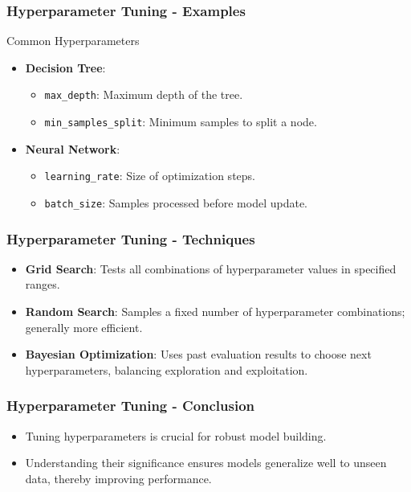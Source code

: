 \documentclass[aspectratio=169]{beamer}
\begin{document}
\begin{frame}[fragile]
    \frametitle{Hyperparameter Tuning - Examples}
    \begin{block}{Common Hyperparameters}
        \begin{itemize}
            \item \textbf{Decision Tree}:
            \begin{itemize}
                \item \texttt{max\_depth}: Maximum depth of the tree.
                \item \texttt{min\_samples\_split}: Minimum samples to split a node.
            \end{itemize}
            \item \textbf{Neural Network}:
            \begin{itemize}
                \item \texttt{learning\_rate}: Size of optimization steps.
                \item \texttt{batch\_size}: Samples processed before model update.
            \end{itemize}
        \end{itemize}
    \end{block}
\end{frame}

\begin{frame}[fragile]
    \frametitle{Hyperparameter Tuning - Techniques}
    \begin{itemize}
        \item \textbf{Grid Search}: Tests all combinations of hyperparameter values in specified ranges.
        \item \textbf{Random Search}: Samples a fixed number of hyperparameter combinations; generally more efficient.
        \item \textbf{Bayesian Optimization}: Uses past evaluation results to choose next hyperparameters, balancing exploration and exploitation.
    \end{itemize}
\end{frame}

\begin{frame}[fragile]
    \frametitle{Hyperparameter Tuning - Conclusion}
    \begin{itemize}
        \item Tuning hyperparameters is crucial for robust model building.
        \item Understanding their significance ensures models generalize well to unseen data, thereby improving performance.
    \end{itemize}
\end{frame}
\end{document}
